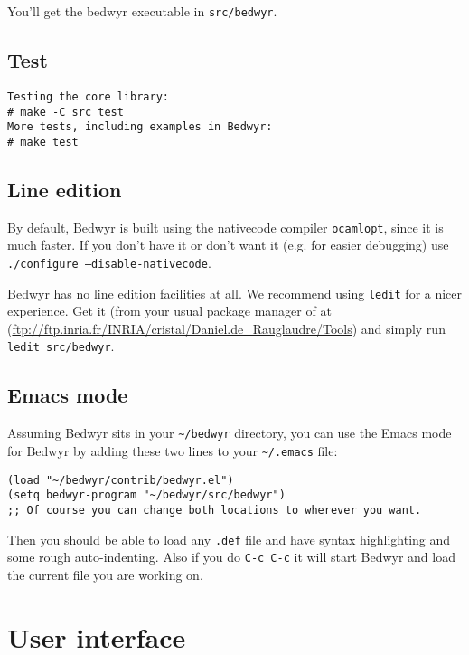 \documentclass{article}
\begin{document}
You'll get the bedwyr executable in \texttt{src/bedwyr}.

\subsection{Test}

\begin{verbatim}
Testing the core library:
# make -C src test
More tests, including examples in Bedwyr:
# make test
\end{verbatim}

\subsection{Line edition}

By default, Bedwyr is built using the nativecode compiler \texttt{ocamlopt},
since it is much faster. If you don't have it or don't want it (e.g.
for easier debugging) use \texttt{./configure --disable-nativecode}.

Bedwyr has no line edition facilities at all. We recommend using \texttt{ledit}
for a nicer experience. Get it (from your usual package manager of at
(\url{ftp://ftp.inria.fr/INRIA/cristal/Daniel.de_Rauglaudre/Tools})
and simply run \texttt{ledit src/bedwyr}.

\subsection{Emacs mode}

Assuming Bedwyr sits in your \verb.~/bedwyr. directory,
you can use the Emacs mode for Bedwyr by adding these two lines to your
\verb,~/.emacs, file:
\begin{verbatim}
(load "~/bedwyr/contrib/bedwyr.el")
(setq bedwyr-program "~/bedwyr/src/bedwyr")
;; Of course you can change both locations to wherever you want.
\end{verbatim}

Then you should be able to load any \verb:.def: file
and have syntax highlighting and some rough auto-indenting.
Also if you do \verb.C-c C-c. it will start Bedwyr
and load the current file you are working on.

\newpage
\section{User interface}
\label{sec:interface}
\end{document}
